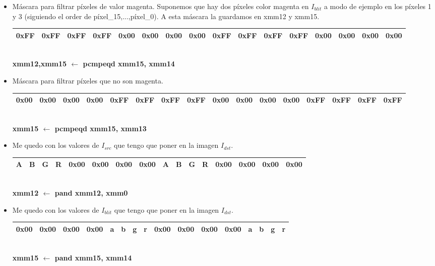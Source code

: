 \begin{itemize}
	\item Máscara para filtrar píxeles de valor magenta. Suponemos que hay dos píxeles color magenta en $I_{blit}$ a modo de ejemplo en los píxeles 1 y 3 (siguiendo el order de píxel_15,...,píxel_0). A esta máscara la guardamos en xmm12 y xmm15.
	
		\begin{center}
		   \begin{tabular}{| c | c | c | c || c | c | c | c || c | c | c | c || c | c | c | c |}
			 \hline
			 0xFF & 0xFF & 0xFF & 0xFF & 0x00 & 0x00 & 0x00 & 0x00 & 0xFF & 0xFF & 0xFF & 0xFF & 0x00 & 0x00 & 0x00 & 0x00 \\ \hline
		   \end{tabular}
		   \\ \textbf{xmm12,xmm15 $\gets$ pcmpeqd xmm15, xmm14}
		\end{center}

	\item Máscara para filtrar píxeles que no son magenta.

		\begin{center}
		   \begin{tabular}{| c | c | c | c || c | c | c | c || c | c | c | c || c | c | c | c |}
			 \hline
			 0x00 & 0x00 & 0x00 & 0x00 & 0xFF & 0xFF & 0xFF & 0xFF & 0x00 & 0x00 & 0x00 & 0x00 & 0xFF & 0xFF & 0xFF & 0xFF \\ \hline
		   \end{tabular}
		   \\ \textbf{xmm15 $\gets$ pcmpeqd xmm15, xmm13}
		\end{center}

	\item  Me quedo con los valores de $I_{src}$ que tengo que poner en la imagen $I_{dst}$.
		\begin{center}
		   \begin{tabular}{| c | c | c | c || c | c | c | c || c | c | c | c || c | c | c | c |}
			 \hline
			 A & B & G & R & 0x00 & 0x00 & 0x00 & 0x00 & A & B & G & R & 0x00 & 0x00 & 0x00 & 0x00 \\ \hline
		   \end{tabular}
		   \\ \textbf{xmm12 $\gets$ pand xmm12, xmm0}
		\end{center}		

	\item Me quedo con los valores de $I_{blit}$ que tengo que poner en la imagen $I_{dst}$.
		\begin{center}
		   \begin{tabular}{| c | c | c | c || c | c | c | c || c | c | c | c || c | c | c | c |}
			 \hline
			 0x00 & 0x00 & 0x00 & 0x00 & a & b & g & r & 0x00 & 0x00 & 0x00 & 0x00 & a & b & g & r \\ \hline
		   \end{tabular}
		   \\ \textbf{xmm15 $\gets$ pand xmm15, xmm14}
		\end{center}		
	

\end{itemize}
